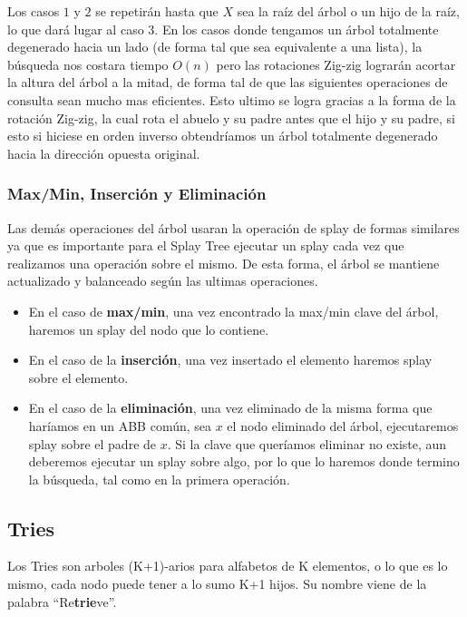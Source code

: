 Los casos $1$ y $2$ se repetir\'an hasta que $X$ sea la ra\'iz del \'arbol o un hijo de la ra\'iz, lo que dar\'a lugar al caso $3$. En los casos donde tengamos un \'arbol totalmente degenerado hacia un lado (de forma tal que sea equivalente a una lista), la b\'usqueda nos costara tiempo $O(n)$ pero las rotaciones Zig-zig lograr\'an acortar la altura del \'arbol a la mitad, de forma tal de que las siguientes operaciones de consulta sean mucho mas eficientes. Esto ultimo se logra gracias a la forma de la rotaci\'on Zig-zig, la cual rota el abuelo y su padre antes que el hijo y su padre, si esto si hiciese en orden inverso obtendr\'iamos un \'arbol totalmente degenerado hacia la direcci\'on opuesta original. 

\subsubsection{Max/Min, Inserci\'on y Eliminaci\'on}

Las dem\'as operaciones del \'arbol usaran la operaci\'on de splay de formas similares ya que es importante para el Splay Tree ejecutar un splay cada vez que realizamos una operaci\'on sobre el mismo. De esta forma, el \'arbol se mantiene actualizado y balanceado seg\'un las ultimas operaciones.

\begin{itemize}
 \item En el caso de \textbf{max/min}, una vez encontrado la max/min clave del \'arbol, haremos un splay del nodo que lo contiene.
 \item En el caso de la \textbf{inserci\'on}, una vez insertado el elemento haremos splay sobre el elemento.
 \item En el caso de la \textbf{eliminaci\'on}, una vez eliminado de la misma forma que har\'iamos en un ABB com\'un, sea $x$ el nodo eliminado del \'arbol, ejecutaremos splay sobre el padre de $x$. Si la clave que quer\'iamos eliminar no existe, aun deberemos ejecutar un splay sobre algo, por lo que lo haremos donde termino la b\'usqueda, tal como en la primera operaci\'on.
\end{itemize}

\subsection{Tries}
Los Tries son arboles (K+1)-arios para alfabetos de K elementos, o lo que es lo mismo, cada nodo puede tener a lo sumo K+1 hijos. Su nombre viene de la palabra ``Re\textbf{trie}ve''.

